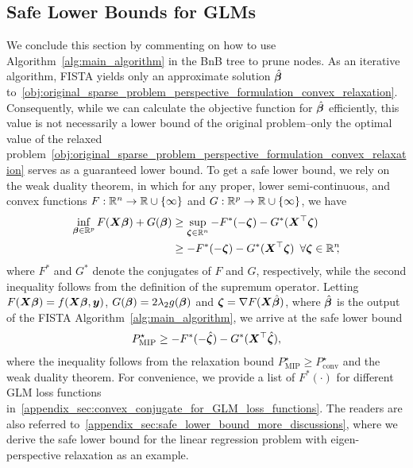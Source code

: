 \subsection{Safe Lower Bounds for GLMs}
\label{subsec:safe_lower_bounds_for_glms}
We conclude this section by commenting on how to use Algorithm~\ref{alg:main_algorithm} in the BnB tree to prune nodes.
As an iterative algorithm, FISTA yields only an approximate solution $\hat{\bm{\beta}}$ to~\eqref{obj:original_sparse_problem_perspective_formulation_convex_relaxation}. Consequently, while we can calculate the objective function for $\hat{\bm{\beta}}$ efficiently, this value is not necessarily a lower bound of the original problem--only the optimal value of the relaxed problem~\eqref{obj:original_sparse_problem_perspective_formulation_convex_relaxation} serves as a guaranteed lower bound.
To get a safe lower bound, we rely on the weak duality theorem, in which for any proper, lower semi-continuous, and convex functions $F: \mathbb{R}^n \to \mathbb{R} \cup \{\infty\}$ and $G: \mathbb{R}^p \to \mathbb{R} \cup \{\infty\}$, we have
\begin{align*}
    \inf_{\bm{\beta} \in \mathbb{R}^p} F(\bm{X} \bm{\beta}) + G(\bm{\beta}) 
    &\geq \sup_{\bm{\zeta} \in \mathbb{R}^n} - F^*(-\bm{\zeta}) - G^*(\bm{X}^\top \bm{\zeta}) \\ 
    &\geq - F^*(-\bm{\zeta}) - G^*(\bm{X}^\top \bm{\zeta}) \,~ \forall \bm{\zeta} \in \mathbb{R}^n\!\!,
\end{align*}
where $F^*$ and $G^*$ denote the conjugates of $F$ and $G$, respectively, while the second inequality follows from the definition of the supremum operator. Letting $F(\bm{X} \bm{\beta}) = f(\bm X \bm \beta, \bm y)$, $G(\bm{\beta}) = 2 \lambda_2 g(\bm{\beta})$ and $\bm{\zeta} = \nabla F(\bm{X} \hat {\bm{\beta}})$, where $\hat {\bm{\beta}}$ is the output of the FISTA Algorithm~\ref{alg:main_algorithm}, we arrive at the safe lower bound
\begin{align}
    \label{eq:fenchel_duality_theorem_F_y(Ax)+G(x)}
    P_{\text{MIP}}^\star \geq - F^*(-\hat{\bm{\zeta}}) - G^*(\bm{X}^\top \hat{\bm{\zeta}}),
\end{align}
where the inequality follows from the relaxation bound $P_{\text{MIP}}^\star \geq P_{\text{conv}}^\star$ and the weak duality theorem.
For convenience, we provide a list of $F^*(\cdot)$ for different GLM loss functions in~\ref{appendix_sec:convex_conjugate_for_GLM_loss_functions}.
The readers are also referred to~\ref{appendix_sec:safe_lower_bound_more_discussions},  where we derive the safe lower bound for the linear regression problem with eigen-perspective relaxation as an example.